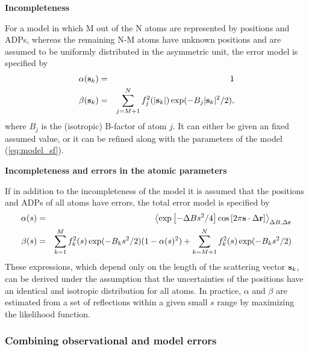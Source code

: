 \documentclass[11pt]{article}
\newcommand{\vect}[1]{{\bf #1}}
\newcommand{\vr}{\vect{r}}
\newcommand{\vs}{\vect{s}}
\begin{document}
\begin{sloppy}
\vspace{2mm}
\textbf{Incompleteness}

For a model in which M out of the N atoms are represented by positions
and ADPs, whereas the remaining N-M atoms have unknown positions and are
assumed to be uniformly distributed in the asymmetric unit, the
error model is specified by
\begin{eqnarray}
\alpha(\vs_k) &=& 1 \\
\beta(\vs_k) &=& \sum_{j=M+1}^N f_j^2(|\vs_k|) \exp(-B_j |\vs_k|^2/2),
\end{eqnarray}
where $B_j$ is the (isotropic) B-factor of atom $j$. It can either
be given an fixed assumed value, or it can be refined along with the
parameters of the model (\ref{eq:model_sf}).

\vspace{2mm}
\textbf{Incompleteness and errors in the atomic parameters}

If in addition to the incompleteness of the model it is assumed that
the positions and ADPs of all atoms have errors, the total error model
is specified by
\begin{eqnarray}
\alpha(s) &=& \left< \exp\left[-\Delta B s^2/4\right]
                       \cos\left[2\pi \vs \cdot \Delta \vr\right]
              \right>_{\Delta B, \Delta \vr}
\\
\beta(s) &=& \sum_{k=1}^M f_k^2(s) \exp(-B_k s^2/2) (1-\alpha(s)^2)
           + \sum_{k=M+1}^N f_k^2(s) \exp(-B_k s^2/2)
\end{eqnarray}
These expressions, which depend only on the length of the scattering
vector $\vs_k$, can be derived under the assumption that the uncertainties
of the positions have an identical and isotropic distribution for all
atoms. In practice, $\alpha$ and $\beta$ are estimated from a set of
reflections within a given small $s$ range by maximizing the likelihood
function.

\subsubsection{Combining observational and model errors}


\end{sloppy}
\end{document}
